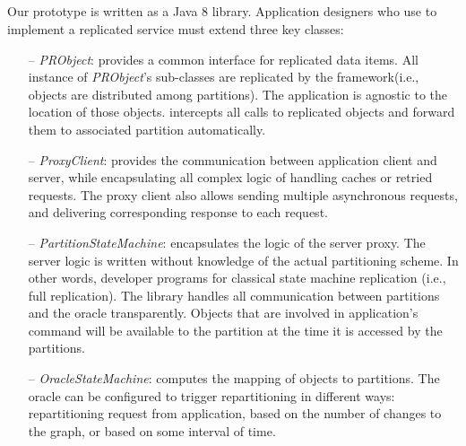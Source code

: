 
\subsection{\dynastar}

Our  \dynastar prototype is written as a Java 8 library. Application designers
who use \dynastar to implement a replicated service must extend three key
classes:
 \begin{itemize}

 \item[--] \emph{PRObject}: provides a common interface for replicated data
 items. All instance of \emph{PRObject}'s sub-classes are replicated by the
 framework(i.e., objects are distributed among partitions). The application is
 agnostic to the location of those objects. \dynastar intercepts all calls to
 replicated objects and forward them to associated partition automatically.

 \item[--] \emph{ProxyClient}: provides the communication between application
 client and server, while encapsulating all complex logic of handling caches or
 retried requests. The proxy client also allows sending multiple asynchronous
 requests, and delivering corresponding response to each request.

 \item[--] \emph{PartitionStateMachine}: encapsulates the logic of the server
  proxy. The server logic is written without knowledge of the actual
  partitioning scheme. In other words, developer programs for classical state
  machine replication (i.e., full replication). The \dynastar library handles
  all communication between partitions and the oracle transparently. Objects
  that are involved in application's command will be available to the
  partition at the time it is accessed by the partitions.

 \item[--] \emph{OracleStateMachine}: computes the mapping of objects to
  partitions. The oracle can be configured to trigger repartitioning in
  different ways: repartitioning request from application, based on the number
  of changes to the graph, or based on some interval of time. 
 \end{itemize}

